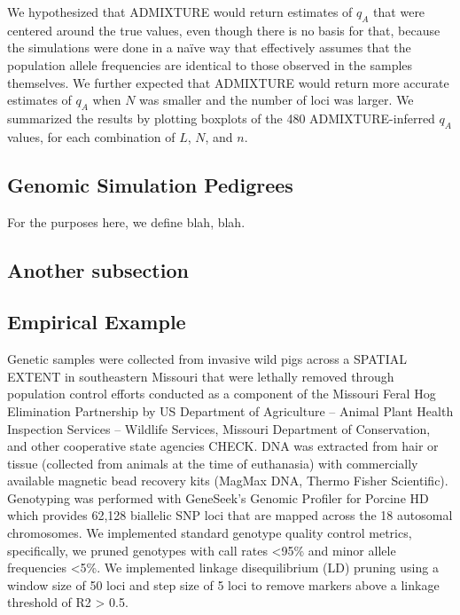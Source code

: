 We hypothesized that ADMIXTURE would return estimates of $q_A$ that were
centered around the true values, even though there is no basis for that, because
the simulations were done in a na\"{i}ve way that effectively assumes that the population
allele frequencies are identical to those observed in the samples themselves.
We further expected that ADMIXTURE would return more accurate estimates of
$q_A$ when $N$ was smaller and the number of loci was larger.
We summarized the results by plotting boxplots of the 480
ADMIXTURE-inferred $q_A$ values, for each combination of $L$, $N$, and $n$.




\subsection*{Genomic Simulation Pedigrees}

For the purposes here, we define blah, blah.

\subsection*{Another subsection}



\subsection*{Empirical Example}

Genetic samples were collected from invasive wild pigs across a SPATIAL EXTENT in southeastern Missouri that were lethally removed through population control efforts conducted as a component of the Missouri Feral Hog Elimination Partnership
by US Department of Agriculture – Animal Plant Health Inspection Services – Wildlife Services, Missouri Department of Conservation, and other cooperative state agencies CHECK.
DNA was extracted from hair or tissue (collected from animals at the time of euthanasia) with commercially available magnetic bead recovery kits (MagMax DNA, Thermo Fisher Scientific).
Genotyping was performed with GeneSeek’s Genomic Profiler for Porcine HD which provides 62,128 biallelic SNP loci that are mapped across the 18 autosomal chromosomes.
We implemented standard genotype quality control metrics, specifically, we pruned genotypes with call rates <95\% and minor allele frequencies <5\%.
We implemented linkage disequilibrium (LD) pruning using a window size of 50 loci and step size of 5 loci to remove markers above a linkage threshold of R2 > 0.5.

